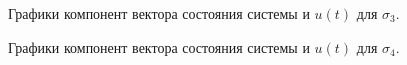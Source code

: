 \begin{figure}[!h]
\caption{Графики компонент вектора состояния системы и $u(t)$ для $\sigma_3$.}
\label{3_x_nlin_s3}
\end{figure}

\begin{figure}[!h]
\caption{Графики компонент вектора состояния системы и $u(t)$ для $\sigma_4$.}
\label{3_x_nlin_s4}
\end{figure}

